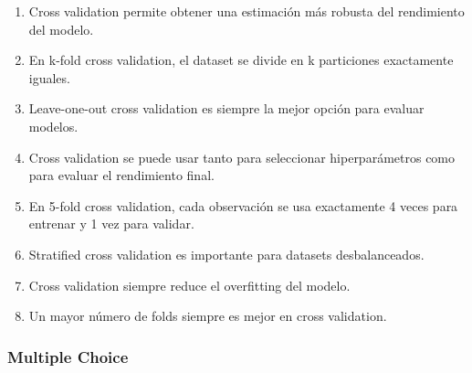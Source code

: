 \documentclass[12pt]{article}
\begin{document}
\begin{enumerate}
    \item Cross validation permite obtener una estimación más robusta del rendimiento del modelo.
    \item En k-fold cross validation, el dataset se divide en k particiones exactamente iguales.
    \item Leave-one-out cross validation es siempre la mejor opción para evaluar modelos.
    \item Cross validation se puede usar tanto para seleccionar hiperparámetros como para evaluar el rendimiento final.
    \item En 5-fold cross validation, cada observación se usa exactamente 4 veces para entrenar y 1 vez para validar.
    \item Stratified cross validation es importante para datasets desbalanceados.
    \item Cross validation siempre reduce el overfitting del modelo.
    \item Un mayor número de folds siempre es mejor en cross validation.
\end{enumerate}

\subsubsection{Multiple Choice}
\end{document}
